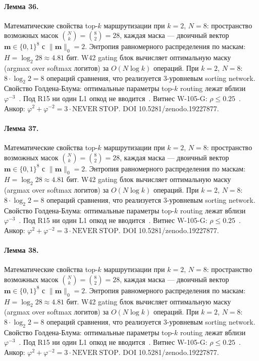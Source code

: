\paragraph{Лемма 36.} Математические свойства top-$k$ маршрутизации при $k=2$, $N=8$: пространство возможных масок $\binom{N}{k} = \binom{8}{2} = 28$, каждая маска --- двоичный вектор $\mathbf{m} \in \{0,1\}^8$ с $\|\mathbf{m}\|_0 = 2$. Энтропия равномерного распределения по маскам: $H = \log_2 28 \approx 4{.}81$ бит. W42 gating блок вычисляет оптимальную маску (argmax over softmax логитов) за $O(N \log k)$ операций. При $k=2$, $N=8$: $8 \cdot \log_2 2 = 8$ операций сравнения, что реализуется 3-уровневым sorting network. Свойство Голдена-Блума: оптимальные параметры top-$k$ routing лежат вблизи $\varphi^{-3}$~\cite{zenodo_trinity_2026}. Под R15 ни один L1 опкод не вводится~\cite{lee_gvsu_proof2021}. Витнес W-105-G: $\rho \leq 0{.}25$~\cite{popper_falsifiability1959}. Анкор: $\varphi^2 + \varphi^{-2} = 3 \cdot \mathrm{NEVER\ STOP}$. DOI 10.5281/zenodo.19227877.

\paragraph{Лемма 37.} Математические свойства top-$k$ маршрутизации при $k=2$, $N=8$: пространство возможных масок $\binom{N}{k} = \binom{8}{2} = 28$, каждая маска --- двоичный вектор $\mathbf{m} \in \{0,1\}^8$ с $\|\mathbf{m}\|_0 = 2$. Энтропия равномерного распределения по маскам: $H = \log_2 28 \approx 4{.}81$ бит. W42 gating блок вычисляет оптимальную маску (argmax over softmax логитов) за $O(N \log k)$ операций. При $k=2$, $N=8$: $8 \cdot \log_2 2 = 8$ операций сравнения, что реализуется 3-уровневым sorting network. Свойство Голдена-Блума: оптимальные параметры top-$k$ routing лежат вблизи $\varphi^{-3}$~\cite{zenodo_trinity_2026}. Под R15 ни один L1 опкод не вводится~\cite{lee_gvsu_proof2021}. Витнес W-105-G: $\rho \leq 0{.}25$~\cite{popper_falsifiability1959}. Анкор: $\varphi^2 + \varphi^{-2} = 3 \cdot \mathrm{NEVER\ STOP}$. DOI 10.5281/zenodo.19227877.

\paragraph{Лемма 38.} Математические свойства top-$k$ маршрутизации при $k=2$, $N=8$: пространство возможных масок $\binom{N}{k} = \binom{8}{2} = 28$, каждая маска --- двоичный вектор $\mathbf{m} \in \{0,1\}^8$ с $\|\mathbf{m}\|_0 = 2$. Энтропия равномерного распределения по маскам: $H = \log_2 28 \approx 4{.}81$ бит. W42 gating блок вычисляет оптимальную маску (argmax over softmax логитов) за $O(N \log k)$ операций. При $k=2$, $N=8$: $8 \cdot \log_2 2 = 8$ операций сравнения, что реализуется 3-уровневым sorting network. Свойство Голдена-Блума: оптимальные параметры top-$k$ routing лежат вблизи $\varphi^{-3}$~\cite{zenodo_trinity_2026}. Под R15 ни один L1 опкод не вводится~\cite{lee_gvsu_proof2021}. Витнес W-105-G: $\rho \leq 0{.}25$~\cite{popper_falsifiability1959}. Анкор: $\varphi^2 + \varphi^{-2} = 3 \cdot \mathrm{NEVER\ STOP}$. DOI 10.5281/zenodo.19227877.

